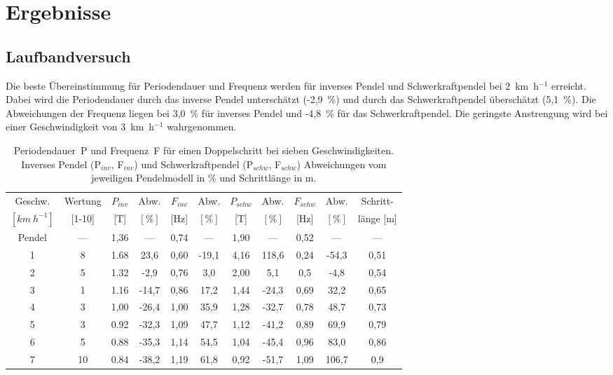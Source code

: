 \section{Ergebnisse}
\vspace{-7pt}
\subsection{Laufbandversuch}
\vspace{-3pt}
Die beste Übereinstimmung für Periodendauer und Frequenz werden für inverses Pendel und Schwerkraftpendel bei 2~km~h$^{-1}$ erreicht. Dabei wird die Periodendauer durch das inverse Pendel unterschätzt (-2,9~\%) und durch das Schwerkraftpendel überschätzt (5,1~\%). Die Abweichungen der Frequenz liegen bei 3,0~\% für inverses Pendel und -4,8~\% für das Schwerkraftpendel. Die geringste Anstrengung wird bei einer Geschwindigkeit von 3~km~h$^{-1}$ wahrgenommen.
\begin{table}[h!]
\centering
\caption[Ergebnisse Laufbandversuch]{Periodendauer~P und Frequenz~F für einen Doppelschritt bei sieben Geschwindigkeiten. Inverses Pendel (P$_{inv}$, F$_{inv}$) und Schwerkraftpendel (P$_{schw}$, F$_{schw}$) Abweichungen vom jeweiligen Pendelmodell in \% und Schrittlänge in m.}
\label{tab:Erg_Pend}
\begin{tabular}{c c c c c c c c c c c}
\toprule
Geschw. & Wertung & $P_{inv}$ & Abw. & $F_{inv}$ & Abw. & $P_{schw}$ & Abw. & $F_{schw}$ & Abw. & Schritt-\\
$[km~h^{-1}]$  & [1-10] & [T] & $[\%]$ & [Hz] & $[\%]$ &  [T] & $[\%]$ & [Hz] & $[\%]$ & länge [m]\\
\midrule
Pendel	&---& 1,36 	& ---	& 0,74 	& ---	& 1,90	&---	& 0,52&	---		& ---	\\
1 		& 8	& 1.68 	& 23,6	& 0,60 	&  -19,1& 4,16	& 118,6	& 0,24&	-54,3	& 0,51	\\
2 		& 5 & 1.32 	& -2,9	& 0,76 	&  3,0	& 2,00	& 5,1 	& 0,5 &	-4,8	& 0,54	\\
3 		& 1 & 1.16 	& -14,7	& 0,86 	& 17,2	& 1,44	& -24,3	& 0,69&	32,2	& 0,65	\\
4 		& 3 & 1,00	& -26,4	& 1,00 	& 35,9	& 1,28	& -32,7	& 0,78&	48,7	& 0,73	\\
5 		& 3 & 0.92 	& -32,3	& 1,09 	& 47,7	& 1,12	& -41,2	& 0,89&	69,9	& 0,79	\\
6 		& 5 & 0.88 	& -35,3	& 1,14 	& 54,5	& 1,04	& -45,4	& 0,96&	83,0	& 0,86	\\
7 		& 10& 0.84 	& -38,2	& 1,19 	& 61,8	& 0,92	& -51,7	& 1,09&	106,7	& 0,9	\\
\bottomrule
\end{tabular}
\end{table}
\vspace{-15pt}
